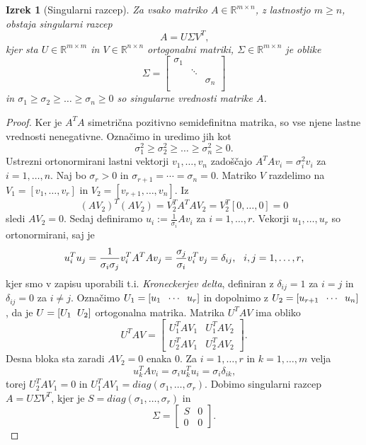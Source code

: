 \documentclass[mat1]{article}
\newtheorem{izrek}{Izrek}
\theoremstyle{definition}
\begin{document}
\begin{izrek}[Singularni razcep]
\label{izrek:SVD} Za vsako matriko $A \in \mathbb{R}^{m \times n}$, z lastnostjo $m \geq n$, obstaja singularni razcep 
$$A = U \Sigma V^T \text{,}$$
kjer sta $U \in \mathbb{R}^{m \times m}$ in $V \in \mathbb{R}^{n \times n}$ ortogonalni matriki, $\Sigma \in \mathbb{R}^{m \times n}$ je oblike
$$
\Sigma = 
\begin{bmatrix} 
\sigma_1 &  & \\
 & \ddots & \\
 & & \sigma_n  \\
 & & 
\end{bmatrix}$$
in $\sigma_1 \geq \sigma_2 \geq \ldots \geq \sigma_n \geq 0$ so singularne vrednosti matrike $A$.
\end{izrek}
\begin{proof}
Ker je $A^TA$ simetrična pozitivno semidefinitna matrika, so vse njene lastne vrednosti nenegativne. Označimo in uredimo jih kot
$$\sigma_1^2 \geq \sigma_2^2 \geq \ldots \geq \sigma_n^2 \geq 0 \text{.}$$
Ustrezni ortonormirani lastni vektorji $v_1, \ldots, v_n$ zadoščajo
$A^T A v_i = \sigma_i^2 v_i$ za $i = 1, \ldots, n \text{.}$
Naj bo $\sigma_r > 0$ in $\sigma_{r+1} = \cdots = \sigma_n = 0 \text{.}$
Matriko $V$ razdelimo na $V_1 = 
\left[ v_1, \ldots, v_r
\right]$ in $V_2 = 
\left[ v_{r+1}, \ldots, v_n
\right] \text{.}$ Iz
$$ (AV_2)^T (AV_2) = V_2^T A^T A V_2 = V_2^T \left[ 0, \ldots, 0 \right] = 0
$$
sledi $AV_2 = 0 \text{.}$ Sedaj definiramo $u_i := \frac{1}{\sigma_i} Av_i$ za $i = 1, \ldots, r \text{.}$
Vekorji $u_1, \ldots, u_r$ so ortonormirani, saj je
$$ u_i^T u_j = \frac{1}{\sigma_i \sigma_j} v_i^T A^T A v_j = \frac{\sigma_j}{\sigma_i} v_i^T v_j = \delta_{ij} \text{,} \hspace{3mm} i,j = 1, \ldots, r \text{,}
$$
kjer smo v zapisu uporabili t.i. \emph{Kroneckerjev delta}, definiran z $\delta_{ij} = 1$ za $i = j$ in $\delta_{ij} = 0$ za $i \neq j$. Označimo 
$U_1 = 
\left[ u_1 \hspace{2mm} \cdots \hspace{2mm} u_r
\right]$ in dopolnimo z $U_2 = 
\left[ u_{r+1} \hspace{2mm} \cdots \hspace{2mm} u_n
\right]$, da je $ U = \left[ U_1 \hspace{2mm} U_2 \right]$ ortogonalna matrika. Matrika $U^T A V$ ima obliko 
$$
U^T A V = 
\begin{bmatrix} 
U_1^T A V_1 & U_1^T A V_2 \\
U_2^T A V_1 & U_2^T A V_2
\end{bmatrix}
\text{.}
$$
Desna bloka sta zaradi $AV_2 = 0$ enaka $0$. Za $i = 1, \ldots, r$ in $k = 1, \ldots, m$ velja
$$ u_k^T A v_i = \sigma_i u_k^T u_i = \sigma_i \delta_{ik} \text{,}
$$
torej $U_2^T A V_1 = 0$ in $U_1^T A V_1 = diag(\sigma_1, \ldots, \sigma_r) \text{.}$ Dobimo singularni razcep $A = U \Sigma V^T \text{,}$ kjer je $S = diag(\sigma_1, \ldots, \sigma_r)$ in 
$$ \Sigma = 
\begin{bmatrix} 
S & 0 \\
0 & 0
\end{bmatrix}
\text{.}$$

\end{proof}
\end{document}
